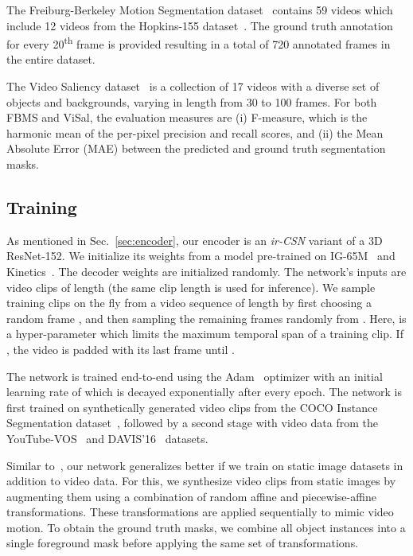\documentclass{bmvc2k_arxiv}
\newcommand{\PAR}[1]{\vskip4pt \noindent {\bf #1~}}
\begin{document}
\PAR{FBMS.} The Freiburg-Berkeley Motion Segmentation dataset~\cite{Ochs13TPAMI} contains 59 videos which include 12 videos from the Hopkins-155 dataset~\cite{Tron07CVPR}. 
The ground truth annotation for every 20\textsuperscript{th} frame is provided resulting in a total of 720 annotated frames in the entire dataset.

\PAR{ViSal.} The Video Saliency dataset~\cite{Wang15TIP} is a collection of 17 videos with a diverse set of objects and backgrounds, varying in length from 30 to 100 frames.
For both FBMS and ViSal, the evaluation measures are (i) F-measure, which is the harmonic mean of the per-pixel precision and recall scores, and (ii) the Mean Absolute Error (MAE)  between the predicted and ground truth segmentation masks.

\subsection{Training}
\label{sec:training}

As mentioned in Sec.~\ref{sec:encoder}, our encoder is an \textit{ir-CSN} variant of a 3D ResNet-152. We initialize its weights from a model pre-trained on IG-65M~\cite{Ghadiyaram19CVPR} and Kinetics~\cite{Kay17ARXIV}. The decoder weights are initialized randomly. 
The network's inputs are video clips of length  (the same clip length is used for inference). We sample training clips on the fly from a video sequence of length  by first choosing a random frame , and then sampling the remaining  frames randomly from .
Here,  is a hyper-parameter which limits the maximum temporal span of a training clip. If , the video is padded with its last frame until . 

The network is trained end-to-end using the Adam~\cite{Kingma15ICLR} optimizer with an initial learning rate of  which is decayed exponentially after every epoch. The network is first trained on synthetically generated video clips from the COCO Instance Segmentation dataset~\cite{Lin14ECCV}, followed by a second stage with video data from the YouTube-VOS~\cite{Xu18ECCV} and DAVIS'16~\cite{Perazzi16CVPR} datasets. 

\PAR{Pre-training on Images:} Similar to~\cite{athar20arxiv,Wug18CVPR,Wang18TIP}, our network generalizes better if we train on static image datasets in addition to video data. For this, we synthesize video clips from static images by augmenting them using a combination of random affine and piecewise-affine transformations. These transformations are applied sequentially to mimic video motion.
To obtain the ground truth masks, we combine all object instances into a single foreground mask before applying the same set of transformations.
    
\end{document}
